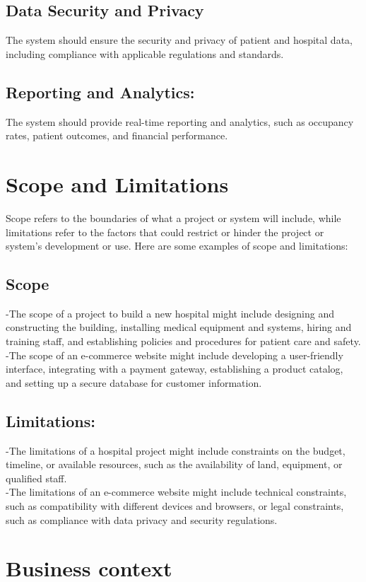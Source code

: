 \subsection{Data Security and Privacy} The system should ensure the security and privacy of patient and hospital data, including compliance with applicable regulations and standards.
\subsection{Reporting and Analytics:} The system should provide real-time reporting and analytics, such as occupancy rates, patient outcomes, and financial performance.
\pagebreak

\section{Scope and Limitations \label{Section::Scope and Limitations}}
Scope refers to the boundaries of what a project or system will include, while limitations refer to the factors that could restrict or hinder the project or system's development or use. Here are some examples of scope and limitations:
\subsection{Scope} -The scope of a project to build a new hospital might include designing and constructing the building, installing medical equipment and systems, hiring and training staff, and establishing policies and procedures for patient care and safety.\\
-The scope of an e-commerce website might include developing a user-friendly interface, integrating with a payment gateway, establishing a product catalog, and setting up a secure database for customer information.
\subsection{Limitations:} -The limitations of a hospital project might include constraints on the budget, timeline, or available resources, such as the availability of land, equipment, or qualified staff.\\
-The limitations of an e-commerce website might include technical constraints, such as compatibility with different devices and browsers, or legal constraints, such as compliance with data privacy and security regulations.
\section{Business context \label{Section::Business context}}

